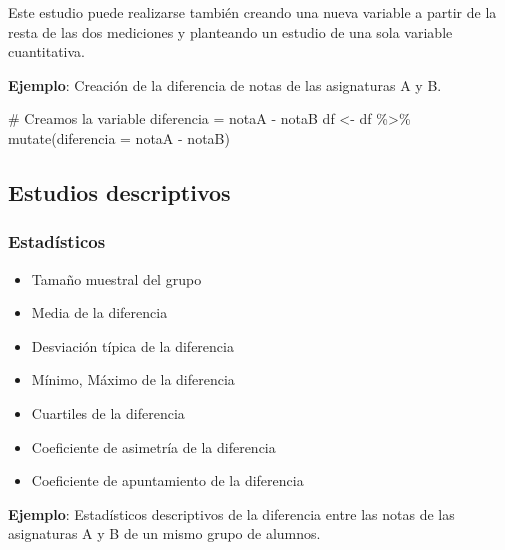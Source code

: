 \documentclass[
  a4paper,
]{scrreport}
\newenvironment{Shaded}{\begin{snugshade}}{\end{snugshade}}
\newcommand{\AttributeTok}[1]{\textcolor[rgb]{0.40,0.45,0.13}{#1}}
\newcommand{\CommentTok}[1]{\textcolor[rgb]{0.37,0.37,0.37}{#1}}
\newcommand{\FunctionTok}[1]{\textcolor[rgb]{0.28,0.35,0.67}{#1}}
\newcommand{\NormalTok}[1]{\textcolor[rgb]{0.00,0.23,0.31}{#1}}
\newcommand{\OtherTok}[1]{\textcolor[rgb]{0.00,0.23,0.31}{#1}}
\newcommand{\SpecialCharTok}[1]{\textcolor[rgb]{0.37,0.37,0.37}{#1}}
\providecommand{\tightlist}{%
  \setlength{\itemsep}{0pt}\setlength{\parskip}{0pt}}\usepackage{longtable,booktabs,array}
\theoremstyle{definition}
\theoremstyle{definition}
\theoremstyle{remark}
\begin{document}
Este estudio puede realizarse también creando una nueva variable a
partir de la resta de las dos mediciones y planteando un estudio de una
sola variable cuantitativa.

\textbf{Ejemplo}: Creación de la diferencia de notas de las asignaturas
A y B.

\begin{Shaded}
\begin{Highlighting}[]
\CommentTok{\# Creamos la variable diferencia = notaA {-} notaB}
\NormalTok{df }\OtherTok{\textless{}{-}}\NormalTok{ df }\SpecialCharTok{\%\textgreater{}\%} \FunctionTok{mutate}\NormalTok{(}\AttributeTok{diferencia =}\NormalTok{ notaA }\SpecialCharTok{{-}}\NormalTok{ notaB)}
\end{Highlighting}
\end{Shaded}

\hypertarget{estudios-descriptivos-3}{%
\subsection{Estudios descriptivos}\label{estudios-descriptivos-3}}

\hypertarget{estaduxedsticos-3}{%
\subsubsection{Estadísticos}\label{estaduxedsticos-3}}

\begin{itemize}
\tightlist
\item
  Tamaño muestral del grupo
\item
  Media de la diferencia
\item
  Desviación típica de la diferencia
\item
  Mínimo, Máximo de la diferencia
\item
  Cuartiles de la diferencia
\item
  Coeficiente de asimetría de la diferencia
\item
  Coeficiente de apuntamiento de la diferencia
\end{itemize}

\textbf{Ejemplo}: Estadísticos descriptivos de la diferencia entre las
notas de las asignaturas A y B de un mismo grupo de alumnos.

\begin{Shaded}
\end{Shaded}
\end{document}
